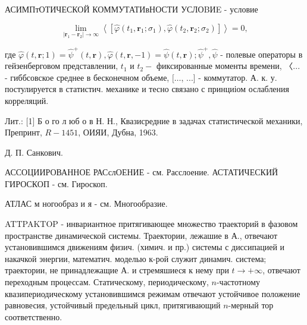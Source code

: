 \documentclass[10pt]{article}
\begin{document}
АСИМПтОТИЧЕСКОЙ КОММУТАТИвНОСТИ УСЛОBИE - условие



\[

\lim _{\left|\boldsymbol{r}_{1}-\boldsymbol{r}_{2}\right| \rightarrow \infty}\left\langle\left[\hat{\varphi}\left(t_{1}, \boldsymbol{r}_{1} ; \sigma_{1}\right), \hat{\varphi}\left(t_{2}, \boldsymbol{r}_{2} ; \sigma_{2}\right)\right]\right\rangle=0,

\]



где $\hat{\varphi}(t, \boldsymbol{r} ; 1)=\hat{\psi}^{+}(t, \boldsymbol{r}), \hat{\varphi}(t, \boldsymbol{r},-1)=\hat{\psi}(t, \boldsymbol{r}) ; \hat{\psi}^{+}, \hat{\psi}$ - полевые операторы в гейзенберговом представлении, $t_{1}$ и $t_{2}-$ фиксированные моменты времени, 〈... - гиббсовское среднее в бесконечном объеме, $[\ldots$, ...] - коммутатор. А. к. у. постулируется в статистич. механике и тесно связано с принциіом ослабления корреляций.



Лит.: [1] Б о го л юб о в Н. Н., Квазисредние в задачах статистической механики, Препринт, $R-1451$, ОИЯИ, Дубна, 1963.



Д. П. Санкович.



АССОЦИИРОВАННОЕ РАСслОЕНИЕ - см. Расслоение. АСТАТИЧЕСКИЙ ГИРОСКОП - см. Гироскоп.



АТЛАС м ногообраз и я - см. Многообразие.



ATTPAKTOP - инвариантное притягивающее множество траекторий в фазовом пространстве динамической системы. Траектории, лежашие в А., отвечают установившимся движениям физич. (химич. и пр.) системы с диссипацией и накачкой энергии, математич. моделью к-рой служит динамич. система; траектории, не принадлежащие А. и стремяшиеся к нему при $t \rightarrow+\infty$, отвечают переходным процессам. Статическому, периодическому, $n$-частотному квазипериодическому установившимся режимам отвечают устойчивое положение равновесия, устойчивый предельный цикл, притягивающий $n$-мерный тор соответственно.
\end{document}
